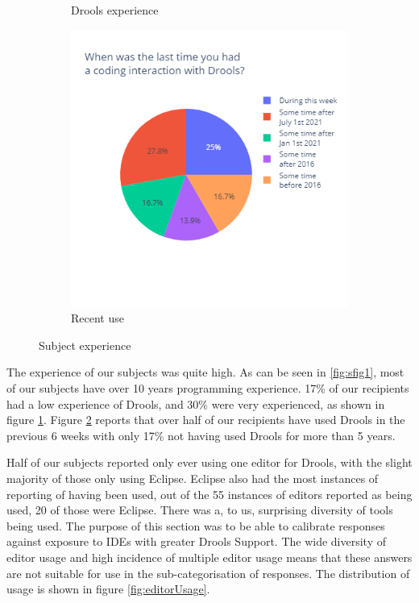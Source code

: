 \begin{figure}[H]
\begin{subfigure}{.33\textwidth}
      \caption{Drools experience}
      \label{fig:sfig2}
    \end{subfigure}
    \begin{subfigure}{.33\textwidth}
        \centering
        \includegraphics[width=.95\linewidth]{Sections/images/pie_recentusage.png}
        \caption{Recent use}
        \label{fig:sfig3}
      \end{subfigure}
    \caption{Subject experience}
    \label{fig:subject_experience}
\end{figure}

The experience of our subjects was quite high.
As can be seen in \ref{fig:sfig1}, most of our subjects have over 10 years programming experience.
17\% of our recipients had a low experience of Drools, and 30\% were very experienced, as shown in figure \ref{fig:sfig2}.
Figure \ref{fig:sfig3} reports that over half of our recipients have used Drools in the previous 6 weeks with only 17\% not having used Drools for more than 5 years.

Half of our subjects reported only ever using one editor for Drools, with the slight majority of those only using Eclipse.
Eclipse also had the most instances of reporting of having been used, out of the 55 instances of editors reported as being used, 20 of those were Eclipse.
There was a, to us, surprising diversity of tools being used.
The purpose of this section was to be able to calibrate responses against exposure to IDEs with greater Drools Support.
The wide diversity of editor usage and high incidence of multiple editor usage means that these answers are not suitable for use in the sub-categorisation of responses. 
The distribution of usage is shown in figure \ref{fig:editorUsage}.

